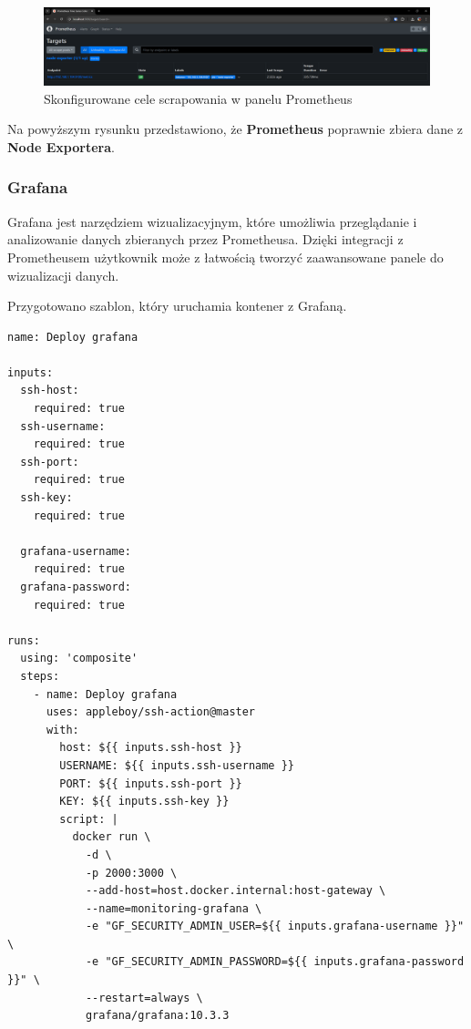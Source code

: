 \documentclass{article}
\begin{document}
\begin{figure}[H]
    \centering
    \includegraphics[width=1\linewidth]{prometheusSprawdzenieKonfiguracji.png}
    \caption{Skonfigurowane cele scrapowania w panelu Prometheus}
    \label{fig:enter-label}
\end{figure}

Na powyższym rysunku przedstawiono, że \textbf{Prometheus} poprawnie zbiera dane z \textbf{Node Exportera}.

\subsubsection{Grafana}

Grafana jest narzędziem wizualizacyjnym, które umożliwia przeglądanie i analizowanie danych zbieranych przez Prometheusa. Dzięki integracji z Prometheusem użytkownik może z łatwością tworzyć zaawansowane panele do wizualizacji danych.

Przygotowano szablon, który uruchamia kontener z Grafaną.

\begin{lstlisting}[caption=Plik \texttt{.github/templates/deploy-grafana/action.yml}]
name: Deploy grafana

inputs:
  ssh-host:
    required: true
  ssh-username:
    required: true
  ssh-port:
    required: true
  ssh-key:
    required: true

  grafana-username:
    required: true
  grafana-password:
    required: true

runs:
  using: 'composite'
  steps:
    - name: Deploy grafana
      uses: appleboy/ssh-action@master
      with:
        host: ${{ inputs.ssh-host }}
        USERNAME: ${{ inputs.ssh-username }}
        PORT: ${{ inputs.ssh-port }}
        KEY: ${{ inputs.ssh-key }}
        script: |
          docker run \
            -d \
            -p 2000:3000 \
            --add-host=host.docker.internal:host-gateway \
            --name=monitoring-grafana \
            -e "GF_SECURITY_ADMIN_USER=${{ inputs.grafana-username }}" \
            -e "GF_SECURITY_ADMIN_PASSWORD=${{ inputs.grafana-password }}" \
            --restart=always \
            grafana/grafana:10.3.3
\end{lstlisting}
\end{document}
